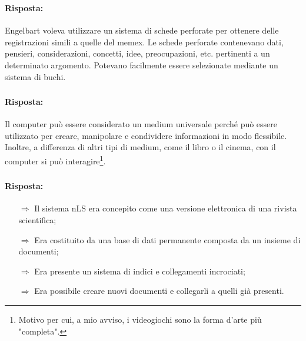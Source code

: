 \subsubsection{}


\paragraph{Risposta:} Engelbart voleva utilizzare un sistema di schede perforate per ottenere delle registrazioni 
simili a quelle del memex. Le schede perforate contenevano dati, pensieri, considerazioni, concetti, idee, preocupazioni,
etc. pertinenti a un determinato argomento. Potevano facilmente essere selezionate mediante un sistema di buchi.

\subsubsection{}


\paragraph{Risposta:} Il computer può essere considerato un medium universale perché può essere utilizzato per
creare, manipolare e condividere informazioni in modo flessibile. Inoltre, a differenza di altri tipi di medium,
come il libro o il cinema, con il computer si può interagire\footnote{Motivo per cui, a mio avviso, i videogiochi sono la forma d'arte più "completa".}.

\subsubsection{}


\paragraph{Risposta:} 

\begin{itemize}
    \item [$\Rightarrow$] Il sistema nLS era concepito come una versione elettronica di una rivista scientifica;
    \item [$\Rightarrow$] Era costituito da una base di dati permanente composta da un insieme di documenti;
    \item [$\Rightarrow$] Era presente un sistema di indici e collegamenti incrociati;
    \item [$\Rightarrow$] Era possibile creare nuovi documenti e collegarli a quelli già presenti.
\end{itemize}

